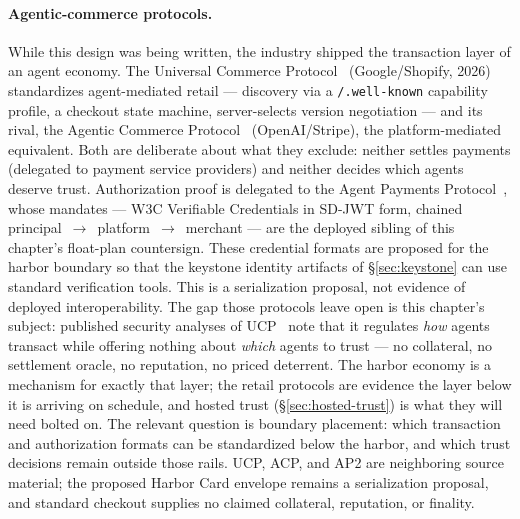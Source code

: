 \documentclass[11pt,a4paper]{article}
\theoremstyle{definition}
\theoremstyle{definition}
\theoremstyle{remark}
\begin{document}
\paragraph{Agentic-commerce protocols.} While this design was being written, the
industry shipped the transaction layer of an agent economy. The Universal Commerce
Protocol~ (Google/Shopify, 2026) standardizes agent-mediated retail
--- discovery via a \texttt{/.well-known} capability profile, a checkout state
machine, server-selects version negotiation --- and its rival, the Agentic Commerce
Protocol~ (OpenAI/Stripe), the platform-mediated equivalent. Both are
deliberate about what they exclude: neither settles payments (delegated to payment
service providers) and neither decides which agents deserve trust. Authorization
proof is delegated to the Agent Payments Protocol~, whose
mandates --- W3C Verifiable Credentials in SD-JWT form, chained
principal~$\to$~platform~$\to$~merchant --- are the deployed sibling of this
chapter's float-plan countersign. These credential formats are proposed for
the harbor boundary so that the keystone
identity artifacts of \S\ref{sec:keystone} can use standard verification tools. This is a serialization proposal, not evidence of deployed interoperability. The
gap those protocols leave open is this chapter's subject: published security analyses
of UCP~ note that it regulates \emph{how} agents transact while
offering nothing about \emph{which} agents to trust --- no collateral, no
settlement oracle, no reputation, no priced deterrent. The harbor economy is a
mechanism for exactly that layer; the retail protocols are evidence the layer below
it is arriving on schedule, and hosted trust (\S\ref{sec:hosted-trust}) is what
they will need bolted on.
The relevant question is boundary placement: which transaction and
authorization formats can be standardized below the harbor, and which trust
decisions remain outside those rails. UCP, ACP, and AP2 are neighboring source
material; the proposed Harbor Card envelope remains a serialization proposal,
and standard checkout supplies no claimed collateral, reputation, or finality.
\end{document}
